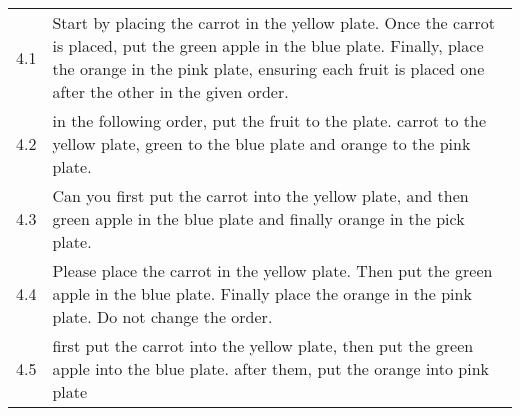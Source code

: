 \documentclass{article}
\begin{document}
\begin{table*}[!tbh]
\begin{tabular}{cp{14cm}}
       
       4.1 & Start by placing the carrot in the yellow plate. Once the carrot is placed, put the green apple in the blue plate. Finally, place the orange in the pink plate, ensuring each fruit is placed one after the other in the given order. \\
       4.2 & in the following order, put the fruit to the plate. carrot to the yellow plate, green to the blue plate and orange to the pink plate. \\
       4.3 & Can you first put the carrot into the yellow plate, and then green apple in the blue plate and finally orange in the pick plate. \\
       4.4 & Please place the carrot in the yellow plate. Then put the green apple in the blue plate. Finally place the orange in the pink plate. Do not change the order.  \\
       4.5 & first put the carrot into the yellow plate, then put the green apple into the blue plate. after them, put the orange into pink plate \\
       

\end{tabular}
\end{table*}
\end{document}
